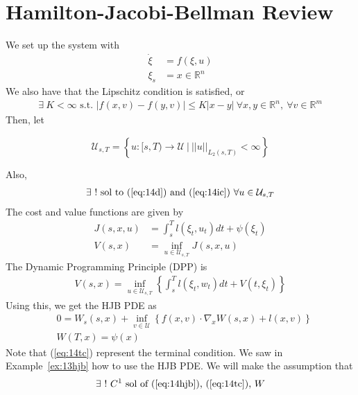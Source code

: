 \mainmatter%
\setcounter{page}{1}

\lectureseries[\course]{\course}

\date{November 17, 2009}

\setaddress%

\setcounter{lecture}{13}
\setcounter{chapter}{13}


\section{Hamilton-Jacobi-Bellman Review}

We set up the system with
\begin{align}
\label{eq:14d}
\dot{\xi} &= f(\xi,u) \\
\label{eq:14ic}
\xi_s &= x\in\mathbb{R}^n
\end{align}
We also have that the Lipschitz condition is satisfied, or
\begin{align}
\label{eq:14l}
\exists~K<\infty \text{~s.t.~} |f(x,v)-f(y,v)| \leq K|x-y|~\forall x,y\in\mathbb{R}^n,~\forall v\in\mathbb{R}^m
\end{align}
Then, let

\begin{equation*}
\mathcal{U}_{s,T} = \left\lbrace u:[s,T)\to\mathcal{U}~|~||u||_{L_2(s,T)}<\infty \right\rbrace%
\end{equation*}

Also,
\begin{align}
\label{eq:14cset}
\exists~! \text{~sol~to~(\ref{eq:14d})~and~(\ref{eq:14ic}) } \forall u\in\mathcal{U}_{s,T}
\end{align}
The cost and value functions are given by
\begin{align*}
J(s,x,u) &= \int_s^T l(\xi_t,u_t)dt + \psi(\xi_t) \\
V(s,x) &= \inf_{u\in\mathcal{U}_{s,T}} J(s,x,u)
\end{align*}
The Dynamic Programming Principle (DPP) is
\begin{align}
\label{eq:14dpp}
V(s,x) = \inf_{u\in\mathcal{U}_{s,T}} \left\lbrace \int_s^T l(\xi_t,w_t)dt + V(t,\xi_t) \right\rbrace
\end{align}
Using this, we get the HJB PDE as
\begin{align}
\label{eq:14hjb}
&0 = W_s(s,x) + \inf_{v\in\mathcal{U}} \left\lbrace f(x,v)\cdot\nabla_x W(s,x)+l(x,v) \right\rbrace \\
\label{eq:14tc}
&W(T,x) = \psi(x)
\end{align}
Note that (\ref{eq:14tc}) represent the terminal condition.
We saw in Example~\ref{ex:13hjb} how to use the HJB PDE\@.
We will make the assumption that
\begin{align}
\label{eq:14ae}
\exists~!~C^1 \text{~sol~of~(\ref{eq:14hjb}),~(\ref{eq:14tc}), } W
\end{align}

